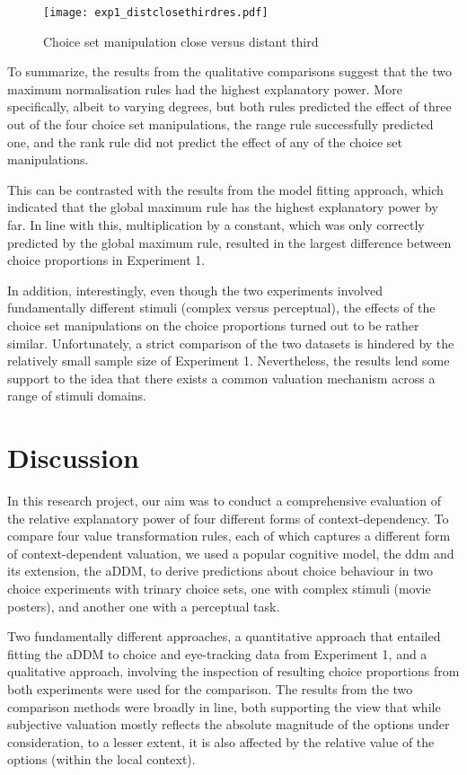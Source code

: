 \documentclass[11pt,a4paper]{article}
\begin{document}
\begin{figure}[!htb]
\captionsetup{justification=centering}
\centering
\caption{Choice set manipulation close versus distant third}
\texttt{[image: exp1\_distclosethirdres.pdf]}
\label{fig:closedist3rd_all}
\end{figure}


To summarize, the results from the qualitative comparisons suggest that the two maximum normalisation rules had the highest explanatory power. More specifically, albeit to varying degrees, but both rules predicted the effect of three out of the four choice set manipulations, the range rule successfully predicted one, and the rank rule did not predict the effect of any of the choice set manipulations.

This can be contrasted with the results from the model fitting approach, which indicated that the global maximum rule has the highest explanatory power by far. In line with this, multiplication by a constant, which was only correctly predicted by the global maximum rule, resulted in the largest difference between choice proportions in Experiment 1.


In addition, interestingly, even though the two experiments involved fundamentally different stimuli (complex versus perceptual), the effects of the choice set manipulations on the choice proportions turned out to be rather similar. Unfortunately, a strict comparison of the two datasets is hindered by the relatively small sample size of Experiment 1. Nevertheless, the results lend some support to the idea that there exists a common valuation mechanism across a range of stimuli domains.



\newpage

\section{Discussion}

In this research project, our aim was to conduct a comprehensive evaluation of the relative explanatory power of four different forms of context-dependency. To compare four value transformation rules, each of which captures a different form of context-dependent valuation, we used a popular cognitive model, the ddm and its extension, the aDDM, to derive predictions about choice behaviour in two choice experiments with trinary choice sets, one with complex stimuli (movie posters), and another one with a perceptual task.

Two fundamentally different approaches, a quantitative approach that entailed fitting the aDDM to choice and eye-tracking data from Experiment 1, and a qualitative approach, involving the inspection of resulting choice proportions from both experiments were used for the comparison. The results from the two comparison methods were broadly in line, both supporting the view that while subjective valuation mostly reflects the absolute magnitude of the options under consideration, to a lesser extent, it is also affected by the relative value of the options (within the local context).
\end{document}
